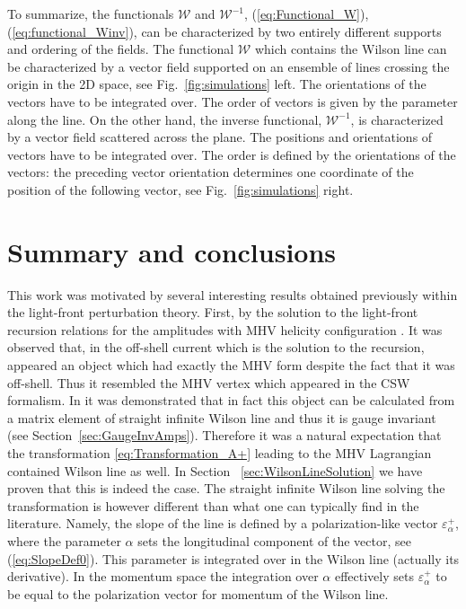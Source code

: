 \documentclass[english,american]{article}
\begin{document}
To summarize, the functionals $\mathcal{W}$ and $\mathcal{W}^{-1}$,
(\ref{eq:Functional_W}), (\ref{eq:functional_Winv}), can be characterized
by two entirely different supports and ordering of the fields. The functional $\mathcal{W}$
which contains the Wilson line can be characterized by a vector field
supported on an ensemble of lines crossing the origin in the 2D space,
see Fig.~\ref{fig:simulations} left. The orientations of the vectors have to be integrated over. 
The order of vectors is given by the parameter along the line. On the other hand, the inverse
functional, $\mathcal{W}^{-1}$, is characterized by a vector field
scattered across the plane. The positions and orientations of vectors have to be integrated over. 
The order is defined by the orientations of the vectors: the preceding vector orientation determines 
one coordinate of the position of the following vector, see Fig.~\ref{fig:simulations}
right. 

\section{Summary and conclusions}

\label{sec:Summary}

This work was motivated by several interesting results obtained previously within
the light-front perturbation theory. First, by the solution to the light-front
recursion relations for the amplitudes with MHV helicity configuration \citep{Cruz-Santiago2013}.
It was observed that, in the off-shell current which is the solution to the recursion, 
appeared an object which had exactly the MHV form despite the fact that it was off-shell.
Thus it  resembled the MHV vertex which appeared in the CSW formalism.
 In \citep{Cruz-Santiago2015}
it was demonstrated that in fact this object can be calculated from a 
matrix element of straight infinite Wilson line and thus it is gauge
invariant (see Section~\ref{sec:GaugeInvAmps}). Therefore it was a natural expectation that the transformation \eqref{eq:Transformation_A+} leading to the MHV Lagrangian contained Wilson line as well.
In Section ~\ref{sec:WilsonLineSolution} we have proven that this is indeed the case.
The straight infinite Wilson line solving
the transformation is however  different than what one can
typically find in the literature. Namely, the slope of the line is
defined by a polarization-like vector $\varepsilon_{\alpha}^{+}$,
where the parameter $\alpha$ sets the longitudinal component of the
vector, see (\ref{eq:SlopeDef0}). This parameter is integrated over
in the Wilson line (actually its derivative).
 In the momentum space the integration
over $\alpha$ effectively sets $\varepsilon_{\alpha}^{+}$ to be equal to
the polarization vector for momentum of the Wilson line.
\end{document}
